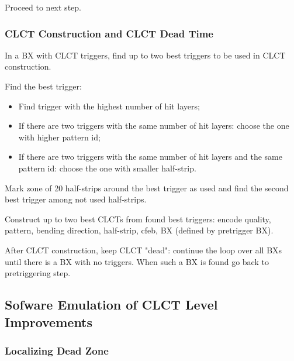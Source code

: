 Proceed to next step.

\subsubsection{CLCT Construction and CLCT Dead Time}

In a BX with CLCT triggers, find up to two best triggers to be used in CLCT construction.

Find the best trigger:
\begin{itemize}
    \item Find trigger with the highest number of hit layers;
    \item If there are two triggers with the same number of hit layers: choose the one with higher pattern id;
    \item If there are two triggers with the same number of hit layers and the same pattern id: choose the one with smaller half-strip.
\end{itemize}

Mark zone of 20 half-strips around the best trigger as used and find the second best trigger among not used half-strips.

Construct up to two best CLCTs from found best triggers: encode quality, pattern, bending direction, half-strip, cfeb, BX (defined by pretrigger BX).

After CLCT construction, keep CLCT "dead": continue the loop over all BXs until there is a BX with no triggers. When such a BX is found go back to pretriggering step.


\newpage
\subsection{Sofware Emulation of CLCT Level Improvements}

\subsubsection{Localizing Dead Zone}

